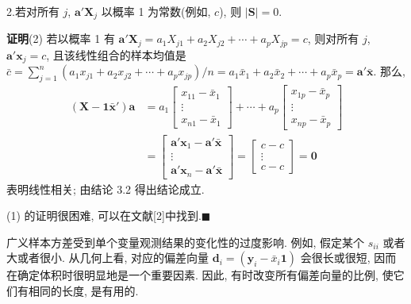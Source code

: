 2.\quad 若对所有 $j$, $\mathbf{a}'\mathbf{X}_{j}$ 以概率 1 为常数(例如, $c$), 则 $|\mathbf{S}|=0$.

\noindent\textbf{证明}\quad (2) 若以概率 1 有 $\mathbf{a}'\mathbf{X}_{j}=a_{1}X_{j1}+a_{2}X_{j2}+\cdots+a_{p}X_{jp}=c$, 则对所有 $j$, $\mathbf{a}'\mathbf{x}_{j}=c$, 且该线性组合的样本均值是 $\bar{c}=\sum_{j=1}^{n}(a_{1}x_{j1}+a_{2}x_{j2}+\cdots+a_{p}x_{jp})/n=a_{1}\bar{x}_{1}+a_{2}\bar{x}_{2}+\cdots+a_{p}\bar{x}_{p}=\mathbf{a}'\bar{\mathbf{x}}$. 那么,
\begin{align*}
(\mathbf{X}-\mathbf{1}\bar{\mathbf{x}}')\mathbf{a}&=a_{1}\begin{bmatrix}x_{11}-\bar{x}_{1}\\\vdots\\x_{n1}-\bar{x}_{1}\end{bmatrix}+\cdots+a_{p}\begin{bmatrix}x_{1p}-\bar{x}_{p}\\\vdots\\x_{np}-\bar{x}_{p}\end{bmatrix}\\
&=\begin{bmatrix}\mathbf{a}'\mathbf{x}_{1}-\mathbf{a}'\bar{\mathbf{x}}\\\vdots\\\mathbf{a}'\mathbf{x}_{n}-\mathbf{a}'\bar{\mathbf{x}}\end{bmatrix}=\begin{bmatrix}c-c\\\vdots\\c-c\end{bmatrix}=\mathbf{0}
\end{align*}
表明线性相关; 由结论 3.2 得出结论成立.

(1) 的证明很困难, 可以在文献[2]中找到.\hfill$\blacksquare$


广义样本方差受到单个变量观测结果的变化性的过度影响. 例如, 假定某个 $s_{ii}$ 或者大或者很小. 从几何上看, 对应的偏差向量 $\mathbf{d}_{i}=(\mathbf{y}_{i}-\bar{x}_{i}\mathbf{1})$ 会很长或很短, 因而在确定体积时很明显地是一个重要因素. 因此, 有时改变所有偏差向量的比例, 使它们有相同的长度, 是有用的.

